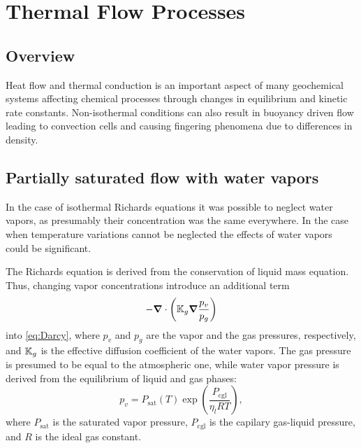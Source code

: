 %
%

\section{Thermal Flow Processes}

\label{sec:thermal-processes}

\subsection{Overview}

Heat flow and thermal conduction is an important aspect of many geochemical systems 
affecting chemical processes through changes in equilibrium and kinetic rate constants. 
Non-isothermal conditions can also result in buoyancy driven flow leading to convection cells 
and causing fingering phenomena due to differences in density.



\subsection{Partially saturated flow with water vapors}

In the case of isothermal Richards equations it was possible to neglect water vapors, as 
presumably their concentration was the same everywhere. 
In the case when temperature variations cannot be neglected the effects of water vapors could be significant.

The Richards equation is derived from the conservation of liquid mass equation.
Thus, changing vapor concentrations introduce an additional term 
$$
  -{\boldsymbol{\nabla}} \cdot \left( {\mathbb K}_g {\boldsymbol{\nabla}} \frac{p_v}{p_g} \right) 
$$
into \eqref{eq:Darcy}, where 
$p_v$ and $p_g$ are the vapor and the gas pressures, respectively,
and
${\mathbb K}_g$ is the effective diffusion coefficient of the water vapors.
The gas pressure is presumed to be equal to the atmospheric one,
while water vapor pressure is derived from the equilibrium of liquid and gas phases:
\[
  p_v = P_\text{sat} (T) \exp\left(\frac{P_\text{cgl}}{\eta_l RT}\right),
\] 
where 
$P_\text{sat}$ is the saturated vapor pressure,
$P_\text{cgl}$ is the capilary gas-liquid pressure, and 
$R$ is the ideal gas constant.  

